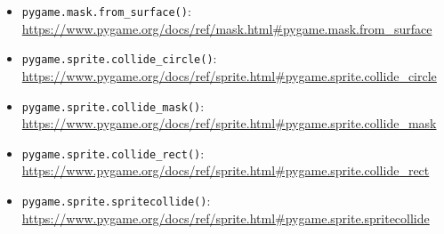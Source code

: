 \begin{itemize}
	\item \texttt{pygame.mask.from\_surface()}:
	\\ 
    \url{https://www.pygame.org/docs/ref/mask.html#pygame.mask.from_surface}
	
	\item \texttt{pygame.sprite.collide\_circle()}:
	\\ 
    \url{https://www.pygame.org/docs/ref/sprite.html#pygame.sprite.collide_circle}

	\item \texttt{pygame.sprite.collide\_mask()}:
	\\ 
    \url{https://www.pygame.org/docs/ref/sprite.html#pygame.sprite.collide_mask}

	\item \texttt{pygame.sprite.collide\_rect()}:
	\\ 
    \url{https://www.pygame.org/docs/ref/sprite.html#pygame.sprite.collide_rect}
	
	\item \texttt{pygame.sprite.spritecollide()}:
	\\ 
    \url{https://www.pygame.org/docs/ref/sprite.html#pygame.sprite.spritecollide}
	
\end{itemize}

